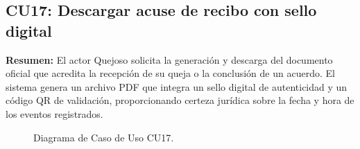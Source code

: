 \begin{appendices}
\subsection{CU17: Descargar acuse de recibo con sello digital}

\textbf{Resumen:} 
El actor Quejoso solicita la generación y descarga del documento oficial que acredita la recepción de su queja o la conclusión de un acuerdo. El sistema genera un archivo PDF que integra un sello digital de autenticidad y un código QR de validación, proporcionando certeza jurídica sobre la fecha y hora de los eventos registrados.

\begin{figure}[htbp]
    \centering
    \figCUdiecisiete
    \caption{Diagrama de Caso de Uso CU17.}
    \label{fig:cu17}
\end{figure}


\end{appendices}
